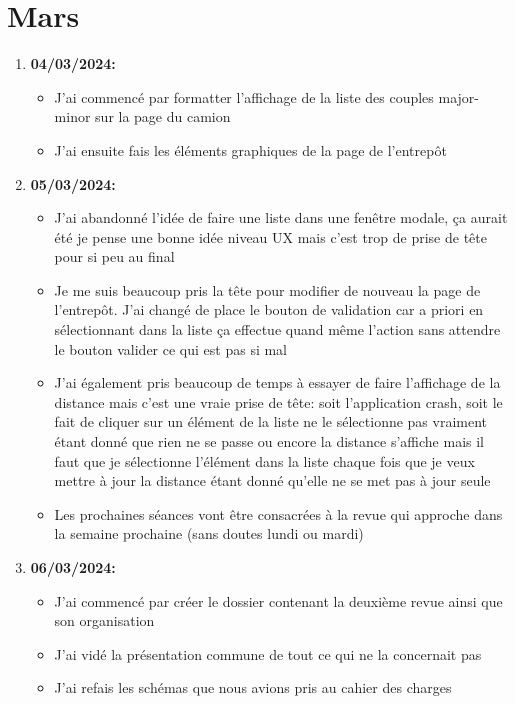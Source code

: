 \documentclass[10pt,a4paper]{book}
\begin{document}
\chapter{Mars}

\begin{enumerate}
    \item \textbf{04/03/2024:}
        \begin{itemize}
            \item J'ai commencé par formatter l'affichage de la liste des couples major-minor sur la page du camion
            \item J'ai ensuite fais les éléments graphiques de la page de l'entrepôt
        \end{itemize}
    \item \textbf{05/03/2024:}
        \begin{itemize}
            \item J'ai abandonné l'idée de faire une liste dans une fenêtre modale, ça aurait été je pense une bonne idée niveau UX mais c'est trop de prise de tête pour si peu au final
            \item Je me suis beaucoup pris la tête pour modifier de nouveau la page de l'entrepôt. J'ai changé de place le bouton de validation car a priori en sélectionnant dans la liste ça effectue quand même l'action sans attendre le bouton valider ce qui est pas si mal
            \item J'ai également pris beaucoup de temps à essayer de faire l'affichage de la distance mais c'est une vraie prise de tête: soit l'application crash, soit le fait de cliquer sur un élément de la liste ne le sélectionne pas vraiment étant donné que rien ne se passe ou encore la distance s'affiche mais il faut que je sélectionne l'élément dans la liste chaque fois que je veux mettre à jour la distance étant donné qu'elle ne se met pas à jour seule
            \item Les prochaines séances vont être consacrées à la revue qui approche dans la semaine prochaine (sans doutes lundi ou mardi)
        \end{itemize}
    \item \textbf{06/03/2024:}
        \begin{itemize}
            \item J'ai commencé par créer le dossier contenant la deuxième revue ainsi que son organisation
            \item J'ai vidé la présentation commune de tout ce qui ne la concernait pas
            \item J'ai refais les schémas que nous avions pris au cahier des charges

\end{itemize}
\end{enumerate}
\end{document}
